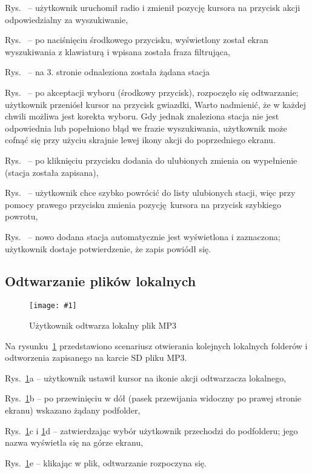 \documentclass[polish]{aghengthesis}
\let\tempone\itemize
\let\temptwo\enditemize
\renewenvironment{itemize}{\tempone\setlength{\itemsep}{0cm}}{\temptwo}
\newcommand{\imgint}[4]{
	\begin{figure}[{#4}]
		\centering
		\texttt{[image: \#1]}
		\caption{#2}
		\label{#1}
	\end{figure}
}
\newcommand{\imgh}[3]{\imgint{#1}{#2}{#3}{H}}
\begin{document}
			\begin{itemize}
				\item Rys.~ -- użytkownik uruchomił radio i zmienił pozycję kursora na przycisk akcji odpowiedzialny za wyszukiwanie,
				\item Rys.~ -- po naciśnięciu środkowego przycisku, wyświetlony został ekran wyszukiwania z klawiaturą i wpisana została fraza filtrująca,
				\item Rys.~ -- na 3. stronie odnaleziona została żądana stacja
				\item Rys.~ -- po akceptacji wyboru (środkowy przycisk), rozpoczęło się odtwarzanie; użytkownik przeniósł kursor na przycisk gwiazdki,
			\end{itemize}
			Warto nadmienić, że w każdej chwili możliwa jest korekta wyboru. Gdy jednak znaleziona stacja nie jest odpowiednia lub popełniono błąd we frazie wyszukiwania, użytkownik może cofnąć się przy użyciu skrajnie lewej ikony akcji do poprzedniego ekranu.
			\begin{itemize}
				\item Rys.~ -- po kliknięciu przycisku dodania do ulubionych zmienia on wypełnienie (stacja została zapisana),
				\item Rys.~ -- użytkownik chce szybko powrócić do listy ulubionych stacji, więc przy pomocy prawego przycisku zmienia pozycję kursora na przycisk szybkiego powrotu,
				\item Rys.~ -- nowo dodana stacja automatycznie jest wyświetlona i zaznaczona; użytkownik dostaje potwierdzenie, że zapis powiódł się.
			\end{itemize}
			
		\subsection{Odtwarzanie plików lokalnych}
			\imgh{5/PicoRadio-fl-local}{Użytkownik odtwarza lokalny plik MP3}{0.9}
			\newcommand{\rflocal}[1]{\ref{5/PicoRadio-fl-local}#1}
			
			Na rysunku~\rflocal{} przedstawiono scenariusz otwierania kolejnych lokalnych folderów i odtworzenia zapisanego na karcie SD pliku MP3.
			
			\begin{itemize}
				\item Rys.~\rflocal{a} -- użytkownik ustawił kursor na ikonie akcji odtwarzacza lokalnego,
				\item Rys.~\rflocal{b} -- po przewinięciu w dół (pasek przewijania widoczny po prawej stronie ekranu) wskazano żądany podfolder,
				\item Rys.~\rflocal{c} i \rflocal{d} -- zatwierdzając wybór użytkownik przechodzi do podfolderu; jego nazwa wyświetla się na górze ekranu,
				\item Rys.~\rflocal{e} -- klikając w plik, odtwarzanie rozpoczyna się.
			\end{itemize}
			
\end{document}
